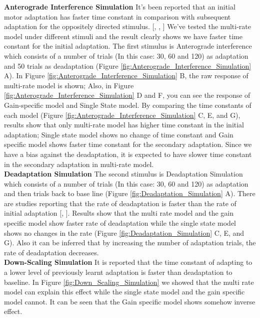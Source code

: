 \documentclass[9pt,twocolumn]{paper-template}
\begin{document}
\textbf{Anterograde Interference Simulation}
It’s been reported that an initial motor adaptation has faster time constant in comparison with subsequent adaptation for the oppositely directed stimulus. [\cite{Bizzi}, \cite{shadmehr_jn}, \cite{Wolpert}] We’ve tested the multi-rate model under different stimuli and the result clearly shows we have faster time constant for the initial adaptation. 
The first stimulus is Anterograde interference which consists of a number of trials (In this case: 30, 60 and 120) as adaptation and 50 trials as deadaptation (Figure \ref{fig:Anterograde_Interference_Simulation} A). In Figure \ref{fig:Anterograde_Interference_Simulation} B, the raw response of multi-rate model is shown; Also, in Figure \ref{fig:Anterograde_Interference_Simulation} D and F, you can see the response of Gain-specific model and Single State model. By comparing the time constants of each model (Figure \ref{fig:Anterograde_Interference_Simulation} C, E, and G), results show that only multi-rate model has higher time constant in the initial adaptation; Single state model shows no change of time constant and Gain specific model shows faster time constant for the secondary adaptation. Since we have a bias against the deadaptation, it is expected to have slower time constant in the secondary adaptation in multi-rate model.\\



\textbf{Deadaptation Simulation }
The second stimulus is Deadaptation Simulation which consists of a number of trials (In this case: 30, 60 and 120) as adaptation and then trials back to base line (Figure \ref{fig:Deadaptation_Simulation} A). There are studies reporting that the rate of deadaptation is faster than the rate of initial adaptation [\cite{Wolpert}, \cite{shadmehr_jnp}]. Results show that the multi rate model and the gain specific model show faster rate of deadaptation while the single state model shows no changes in the rate (Figure \ref{fig:Deadaptation_Simulation} C, E, and G). Also it can be inferred that by increasing the number of adaptation trials, the rate of deadaptation decreases.\\


\textbf{Down-Scaling Simulation}
It is reported that the time constant of adapting to a lower level of previously learnt adaptation is faster than deadaptation to baseline. In Figure \ref{fig:Down_Scaling_Simulation} we showed that the multi rate model can explain this effect while the single state model and the gain specific model cannot. It can be seen that the Gain specific model shows somehow inverse effect.
\end{document}
